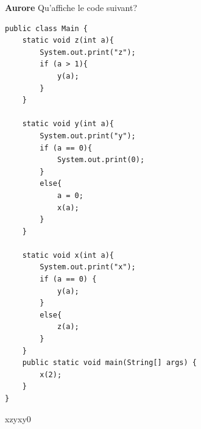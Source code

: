 \begin{Exercice}[5 minutes]\textbf{Aurore}
Qu'affiche le code suivant?
\begin{lstlisting}[style=javastyle]
public class Main {
    static void z(int a){
        System.out.print("z");
        if (a > 1){
            y(a);
        }
    }

    static void y(int a){
        System.out.print("y");
        if (a == 0){
            System.out.print(0);
        }
        else{
            a = 0;
            x(a);
        }
    }

    static void x(int a){
        System.out.print("x");
        if (a == 0) {
            y(a);
        }
        else{
            z(a);
        }
    }
    public static void main(String[] args) {
        x(2);
    }
}
\end{lstlisting}

\begin{solution}
xzyxy0
\end{solution}
\end{Exercice}

